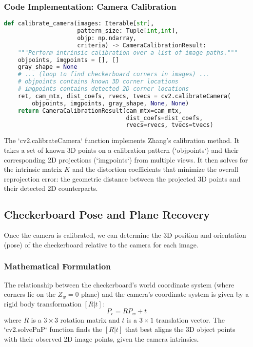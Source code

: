 \documentclass{article}
\begin{document}
\subsubsection{Code Implementation: Camera Calibration}
\begin{lstlisting}[language=Python]
def calibrate_camera(images: Iterable[str], 
                     pattern_size: Tuple[int,int], 
                     objp: np.ndarray, 
                     criteria) -> CameraCalibrationResult:
    """Perform intrinsic calibration over a list of image paths."""
    objpoints, imgpoints = [], []
    gray_shape = None
    # ... (loop to find checkerboard corners in images) ...
    # objpoints contains known 3D corner locations
    # imgpoints contains detected 2D corner locations
    ret, cam_mtx, dist_coefs, rvecs, tvecs = cv2.calibrateCamera(
        objpoints, imgpoints, gray_shape, None, None)
    return CameraCalibrationResult(cam_mtx=cam_mtx, 
                                   dist_coefs=dist_coefs, 
                                   rvecs=rvecs, tvecs=tvecs)
\end{lstlisting}
The `cv2.calibrateCamera` function implements Zhang's calibration method. It takes a set of known 3D points on a calibration pattern (`objpoints`) and their corresponding 2D projections (`imgpoints`) from multiple views. It then solves for the intrinsic matrix $K$ and the distortion coefficients that minimize the overall reprojection error: the geometric distance between the projected 3D points and their detected 2D counterparts.

\subsection{Checkerboard Pose and Plane Recovery}
Once the camera is calibrated, we can determine the 3D position and orientation (pose) of the checkerboard relative to the camera for each image.

\subsubsection{Mathematical Formulation}
The relationship between the checkerboard's world coordinate system (where corners lie on the $Z_w=0$ plane) and the camera's coordinate system is given by a rigid body transformation $[R|t]$:
\begin{equation}
P_c = R P_w + t
\end{equation}
where $R$ is a $3 \times 3$ rotation matrix and $t$ is a $3 \times 1$ translation vector. The `cv2.solvePnP` function finds the $[R|t]$ that best aligns the 3D object points with their observed 2D image points, given the camera intrinsics.
\end{document}
